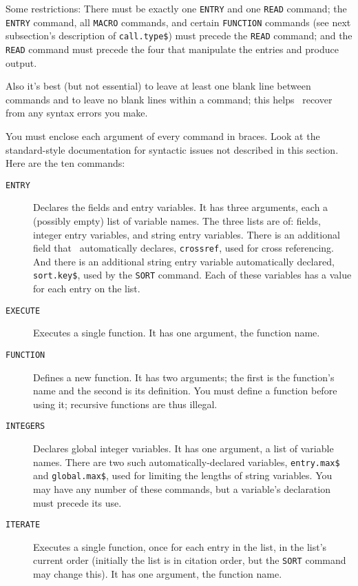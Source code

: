 Some restrictions:
There must be exactly one \hbox{\tt ENTRY} and one \hbox{\tt READ} command;
the \hbox{\tt ENTRY} command, all \hbox{\tt MACRO} commands,
and certain \hbox{\tt FUNCTION} commands
(see next subsection's description of \hbox{\tt call.type\$})
must precede the \hbox{\tt READ} command;
and the \hbox{\tt READ} command must precede the four that
manipulate the entries and produce output.

Also it's best (but not essential) to leave at least one blank line
between commands and to leave no blank lines within a command;
this helps \BibTeX\ recover from any syntax errors you make.

You must enclose each argument of every command in braces.
Look at the standard-style documentation
for syntactic issues not described in this section.
Here are the ten commands:
\begin{description}

\item[\hbox{\tt ENTRY}\hfill]
Declares the fields and entry variables.
It has three arguments, each a (possibly empty) list of variable names.
The three lists are of:
fields, integer entry variables, and string entry variables.
There is an additional field that \BibTeX\ automatically
declares, \hbox{\tt crossref}, used for cross referencing.
And there is an additional string entry variable automatically declared,
\hbox{\tt sort.key\$}, used by the \hbox{\tt SORT} command.
Each of these variables has a value for each entry on the list.

\item[\hbox{\tt EXECUTE}\hfill]
Executes a single function.
It has one argument, the function name.

\item[\hbox{\tt FUNCTION}\hfill]
Defines a new function.
It has two arguments; the first is the function's name and the
second is its definition.
You must define a function before using it;
recursive functions are thus illegal.

\item[\hbox{\tt INTEGERS}\hfill]
Declares global integer variables.
It has one argument, a list of variable names.
There are two such automatically-declared variables,
\hbox{\tt entry.max\$} and \hbox{\tt global.max\$},
used for limiting the lengths of string variables.
You may have any number of these commands, but a variable's declaration
must precede its use.

\item[\hbox{\tt ITERATE}\hfill]
Executes a single function, once
for each entry in the list, in the list's current order
(initially the list is in citation order, but the \hbox{\tt SORT}
command may change this).
It has one argument, the function name.


\end{description}
